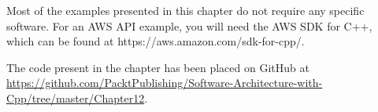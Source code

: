 Most of the examples presented in this chapter do not require any specific software. For an AWS API example, you will need the AWS SDK for C++, which can be found at https://aws.amazon.com/sdk-for-cpp/.

The code present in the chapter has been placed on GitHub at \url{https://github.com/PacktPublishing/Software-Architecture-with-Cpp/tree/master/Chapter12}.